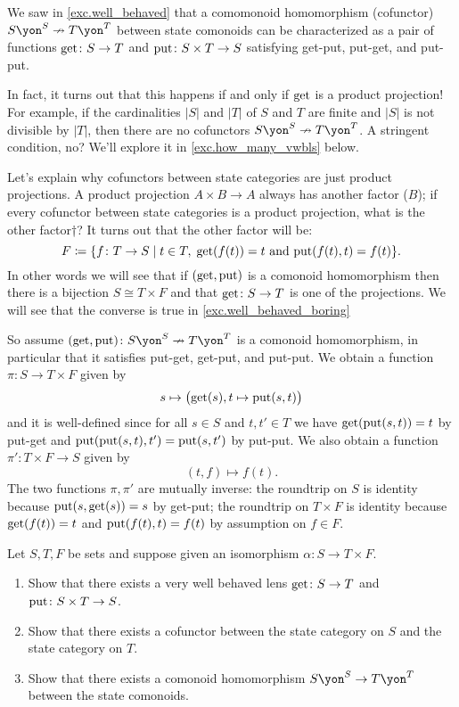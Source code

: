 \documentclass[Book-Poly]{subfiles}
\begin{document}
\begin{example}\label{ex.well_behaved_boring}
We saw in \cref{exc.well_behaved} that a comomonoid homomorphism (cofunctor) $S\yon^S\cof T\yon^T$ between state comonoids can be characterized as a pair of functions $\mathrm{get}\colon S\to T$ and $\mathrm{put}\colon S\times T\to S$ satisfying get-put, put-get, and put-put. 

In fact, it turns out that this happens if and only if $\mathrm{get}$ is a product projection! For example, if the cardinalities $|S|$ and $|T|$ of $S$ and $T$ are finite and $|S|$ is not divisible by $|T|$, then there are no cofunctors $S\yon^S\cof T\yon^T$. A stringent condition, no? We'll explore it in  \cref{exc.how_many_vwbls} below.

Let's explain why cofunctors between state categories are just product projections. A product projection $A\times B\to A$ always has another factor ($B$); if every cofunctor between state categories is a product projection, what is the other factor†? It turns out that the other factor will be:
\[
F\coloneqq\{f\colon T\to S\mid t\in T,\;\mathrm{get}(f(t))=t\text{ and }\mathrm{put}(f(t),t)=f(t)\}.
\]
In other words we will see that if $(\mathrm{get},\mathrm{put})$ is a comonoid homomorphism then there is a bijection $S\cong T\times F$ and that $\mathrm{get}\colon S\to T$ is one of the projections. We will see that the converse is true in \cref{exc.well_behaved_boring}

So assume $(\lensget,\lensput)\colon S\yon^S\cof T\yon^T$ is a comonoid homomorphism, in particular that it satisfies put-get, get-put, and put-put. We obtain a function $\pi\colon S\to T\times F$ given by
\[s\mapsto\big(\mathrm{get}(s),t\mapsto\mathrm{put}(s,t)\big)\]
and it is well-defined since for all $s\in S$ and $t,t'\in T$ we have $\mathrm{get}(\mathrm{put}(s,t))=t$ by put-get and $\mathrm{put}(\mathrm{put}(s,t),t')=\mathrm{put}(s,t')$ by put-put. We also obtain a function $\pi'\colon T\times F\to S$ given by
\[
(t,f)\mapsto f(t).
\]
The two functions $\pi,\pi'$ are mutually inverse: the roundtrip on $S$ is identity because $\mathrm{put}(s,\mathrm{get}(s))=s$ by get-put; the roundtrip on $T\times F$ is identity because $\mathrm{get}(f(t))=t$ and $\mathrm{put}(f(t),t)=f(t)$ by assumption on $f\in F$.
\end{example}

\begin{exercise}\label{exc.well_behaved_boring}
Let $S,T,F$ be sets and suppose given an isomorphism $\alpha\colon S\to T\times F$.
\begin{enumerate}
	\item Show that there exists a very well behaved lens $\mathrm{get}\colon S\to T$ and $\mathrm{put}\colon S\times T\to S$.
	\item Show that there exists a cofunctor between the state category on $S$ and the state category on $T$.
	\item Show that there exists a comonoid homomorphism $S\yon^S\to T\yon^T$ between the state comonoids.
\qedhere
\end{enumerate}
\end{exercise}
\end{document}
